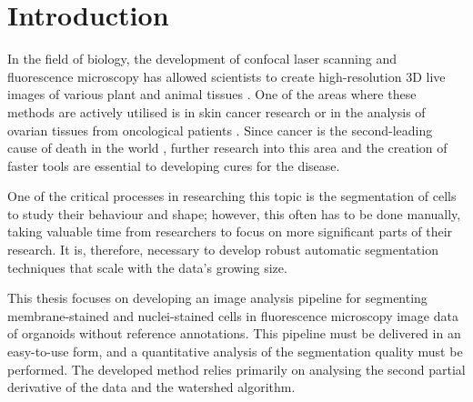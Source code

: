 \documentclass[
  digital,     %
  oneside,     %
  nosansbold,  %
  nocolorbold, %
  lof,         %
  lot,         %
]{fithesis4}
\begin{document}
\chapter*{Introduction}

In the field of biology, the development of confocal laser scanning and
fluorescence microscopy has allowed scientists to create high-resolution 3D live
images of various plant and animal tissues \cite{stegmaier2016}. One of the
areas where these methods are actively utilised is in skin cancer research
\cite{gupta2020} or in the analysis of ovarian tissues from oncological patients
\cite{fabbri2014}. Since cancer is the second-leading cause of death in the
world \cite{mayo-clinic-cancer}, further research into this area and the
creation of faster tools are essential to developing cures for the disease.

One of the critical processes in researching this topic is the segmentation of
cells to study their behaviour and shape; however, this often has to be done
manually, taking valuable time from researchers to focus on more significant
parts of their research. It is, therefore, necessary to develop robust automatic
segmentation techniques that scale with the data's growing size.

This thesis focuses on developing an image analysis pipeline for segmenting
membrane-stained and nuclei-stained cells in fluorescence microscopy image data
of organoids without reference annotations. This pipeline must be delivered in
an easy-to-use form, and a quantitative analysis of the segmentation quality
must be performed. The developed method relies primarily on analysing the second
partial derivative of the data and the watershed algorithm.
\end{document}
